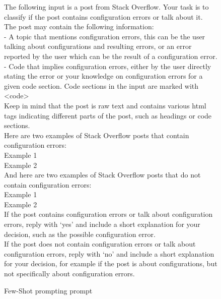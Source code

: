 \documentclass[english,bachelor]{swsLeipzig}
\begin{document}
\begin{figure}[h]
  \begin{tcolorbox}[enhanced jigsaw,drop shadow=black!50!white,colback=white]
    The following input is a post from Stack Overflow. Your task is to classify if the post contains configuration errors or talk about it.\\
The post may contain the following information:\\
- A topic that mentions configuration errors, this can be the user talking about configurations and resulting errors, or an error reported by the user which can be the result of a configuration error.\\
- Code that implies configuration errors, either by the user directly stating the error or your knowledge on configuration errors for a given code section. Code sections in the input are marked with <code>\\
Keep in mind that the post is raw text and contains various html tags indicating different parts of the post, such as headings or code sections.\\
Here are two examples of Stack Overflow posts that contain configuration errors:\\
\lbrack Example 1\rbrack\\
\lbrack Example 2\rbrack\\
And here are two examples of Stack Overflow posts that do not contain configuration errors:\\
\lbrack Example 1\rbrack\\
\lbrack Example 2\rbrack\\
If the post contains configuration errors or talk about configuration errors, reply with `yes' and include a short explanation for your decision, such as the possible configuration error.\\
If the post does not contain configuration errors or talk about configuration errors, reply with `no' and include a short explanation for your decision, for example if the post is about configurations, but not specifically about configuration errors.
  \end{tcolorbox}
  \caption{Few-Shot prompting prompt}
  \label{fig:figure46}
\end{figure}
\end{document}
